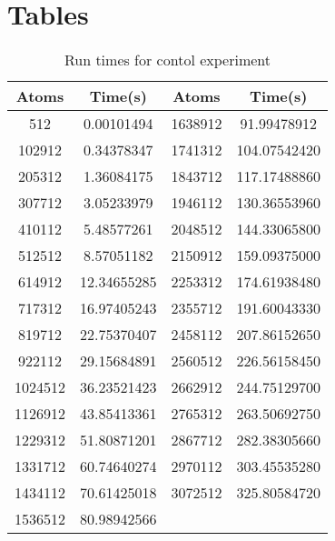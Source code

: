 \documentclass[twocolumn]{article}
\begin{document}
\section{Tables}
\begin{table}[H]
\caption{Run times for contol experiment}
\label{table:1}
\begin{tabular}{ |c|c|c|c| } 
\hline
Atoms & Time(s) & Atoms & Time(s) \\
\hline\hline 
512	& 0.00101494 & 1638912 & 91.99478912 \\
\hline
102912 & 0.34378347 & 1741312 & 104.07542420 \\
\hline
205312 & 1.36084175 & 1843712 & 117.17488860 \\
\hline
307712 & 3.05233979 & 1946112 & 130.36553960 \\
\hline
410112 & 5.48577261 & 2048512 & 144.33065800 \\
\hline
512512 & 8.57051182 & 2150912 & 159.09375000 \\
\hline
614912 & 12.34655285 & 2253312 & 174.61938480 \\
\hline
717312 & 16.97405243 & 2355712 & 191.60043330 \\
\hline
819712 & 22.75370407 & 2458112 & 207.86152650 \\
\hline
922112 & 29.15684891 & 2560512 & 226.56158450 \\
\hline
1024512 & 36.23521423 & 2662912 & 244.75129700 \\
\hline
1126912 & 43.85413361 & 2765312 & 263.50692750 \\
\hline
1229312 & 51.80871201 & 2867712 & 282.38305660 \\
\hline
1331712 & 60.74640274 & 2970112 & 303.45535280 \\
\hline
1434112 & 70.61425018 & 3072512 & 325.80584720 \\
\hline
1536512 & 80.98942566 & & \\
\hline
\end{tabular}
\end{table}



\end{document}
